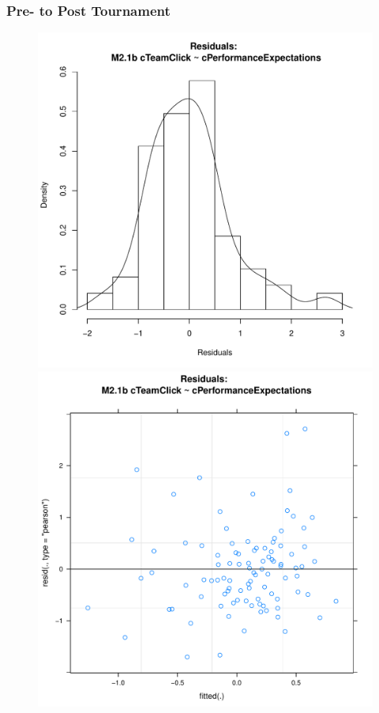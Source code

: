  \subsubsection{Pre- to Post Tournament\label{app8:MLM21b}}

 
 



 \begin{figure}[htbp]
   \includegraphics[scale =.4]{images/MLM21bHist.pdf}
   \includegraphics[scale =.4]{images/MLM21bScatter.pdf}

\end{figure}
